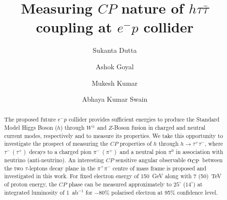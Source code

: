 \documentclass[pdftex,twocolumn,epjc3]{svjour3}          %
\begin{document}
\title{Measuring $CP$ nature of $h\tau{\bar\tau}$ coupling at $e^-p$ collider}

\author{Sukanta Dutta 
             \and Ashok Goyal
             \and Mukesh Kumar
             \and Abhaya Kumar Swain
}



\date{}


\maketitle

\begin{abstract}
The proposed future $e^- p$ collider provides sufficient energies to produce the Standard Model Higgs Boson ($h$) through $W^\pm$ and $Z$-Boson fusion in charged and neutral current modes, respectively and to measure its properties. We take this opportunity to investigate the prospect of measuring the $CP$  properties of $h$ through $h \to \tau^+ \tau^-$, where $\tau^-\,\left(\tau^+\right)$ decays to a charged pion $\pi^-\,\left(\pi^+\right)$ and a neutral pion $\pi^0$ in association with  neutrino (anti-neutrino). An interesting $CP$ sensitive angular observable $\alpha_{\rm CP}$ between the two $\tau$-leptons decay plane in the $\pi^+\pi^-$ centre of mass frame is proposed and investigated in this work. For fixed electron energy of 150~GeV along with 7 (50)~TeV of proton energy, the $CP$ phase can be measured approximately to $25^\circ$ ($14^\circ$) at integrated luminosity of 1~ab$^{-1}$ for $-$80\% polarised electron at 95\% confidence level.    
\end{abstract}
\end{document}
